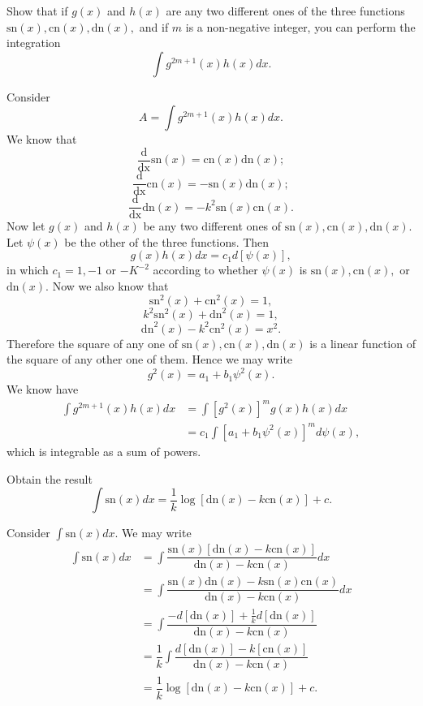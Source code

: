 \begin{problem}\label{problem4chapter21}
Show that if $g(x)$ and $h(x)$ are any two different ones of the three functions $\mathrm{\mathrm{sn}}(x), \mathrm{cn}(x), \mathrm{dn}(x),$ and if $m$ is a non-negative integer, you can perform the integration
$$\displaystyle\int g^{2m+1}(x) h(x) dx.$$
\end{problem}
\begin{solution}
Consider
$$A = \displaystyle\int g^{2m+1}(x) h(x) dx.$$
We know that
$$\dfrac{\mathrm{d}}{\mathrm{dx}} \mathrm{\mathrm{sn}}(x) = \mathrm{cn}(x)\mathrm{dn}(x);$$
$$\dfrac{\mathrm{d}}{\mathrm{dx}} \mathrm{cn}(x) = -\mathrm{\mathrm{sn}}(x) \mathrm{dn}(x);$$
$$\dfrac{\mathrm{d}}{\mathrm{dx}} \mathrm{dn}(x) = -k^2 \mathrm{\mathrm{sn}}(x) \mathrm{cn}(x).$$
Now let $g(x)$ and $h(x)$ be any two different ones of $\mathrm{\mathrm{sn}}(x), \mathrm{cn}(x), \mathrm{dn}(x)$. Let $\psi(x)$ be the other of the three functions. Then
$$g(x) h(x) dx = c_1 d[\psi(x)],$$
in which $c_1=1, -1$ or $-K^{-2}$ according to whether $\psi(x)$ is $\mathrm{\mathrm{sn}}(x), \mathrm{cn}(x),$ or $\mathrm{dn}(x).$
Now we also know that
$$\mathrm{\mathrm{sn}}^2(x) + \mathrm{cn}^2(x) = 1,$$
$$k^2 \mathrm{\mathrm{sn}}^2(x) + \mathrm{dn}^2(x)=1,$$
$$\mathrm{dn}^2(x) - k^2 \mathrm{cn}^2(x) = x^2.$$
Therefore the square of any one of $\mathrm{\mathrm{sn}}(x), \mathrm{cn}(x), \mathrm{dn}(x)$ is a linear function of the square of any other one of them. Hence we may write
$$g^2(x) = a_1+b_1 \psi^2(x).$$
We know have
$$\begin{array}{ll}
\displaystyle\int g^{2m+1}(x) h(x) dx &= \displaystyle\int [g^2(x)]^m g(x) h(x) dx \\
&= c_1 \displaystyle\int [a_1 + b_1 \psi^2(x)]^m d \psi(x),
\end{array}$$
which is integrable as a sum of powers.
\end{solution}
\begin{problem}\label{problem5chapter21}
Obtain the result 
$$\displaystyle\int \mathrm{\mathrm{sn}}(x) dx = \dfrac{1}{k} \log[\mathrm{dn}(x) - k \mathrm{cn}(x)] + c.$$
\end{problem}
\begin{solution}
Consider $\displaystyle\int \mathrm{\mathrm{sn}}(x) dx$. We may write
$$\begin{array}{ll}
\displaystyle\int \mathrm{\mathrm{sn}}(x) dx &= \displaystyle\int \dfrac{\mathrm{\mathrm{sn}}(x)[\mathrm{dn}(x)-k\mathrm{cn}(x)]}{\mathrm{dn}(x)-k\mathrm{cn}(x)} dx \\ 
&= \displaystyle\int \dfrac{\mathrm{\mathrm{sn}}(x) \mathrm{dn}(x) - k\mathrm{\mathrm{sn}}(x) \mathrm{cn}(x)}{\mathrm{dn}(x) - k\mathrm{cn}(x)} dx \\
&= \displaystyle\int \dfrac{-d[\mathrm{dn}(x)] + \frac{1}{k} d[\mathrm{dn}(x)]}{\mathrm{dn}(x) - k\mathrm{cn}(x)} \\
&= \dfrac{1}{k} \displaystyle\int \dfrac{d[\mathrm{dn}(x)]-k[\mathrm{cn}(x)]}{\mathrm{dn}(x) -k \mathrm{cn}(x)} \\
&= \dfrac{1}{k} \log[\mathrm{dn}(x) -k\mathrm{cn}(x)]+c.
\end{array}$$
\end{solution}
